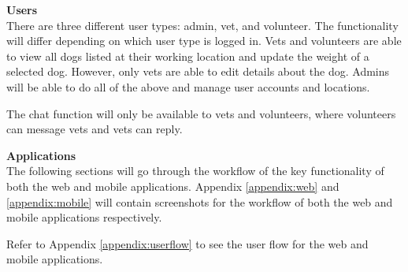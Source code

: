 \textbf{Users}\\
There are three different user types: admin, vet, and volunteer. The functionality will differ depending on which user type is logged in. Vets and volunteers are able to view all dogs listed at their working location and update the weight of a selected dog. However, only vets are able to edit details about the dog. Admins will be able to do all of the above and manage user accounts and locations.

The chat function will only be available to vets and volunteers, where volunteers can message vets and vets can reply.

\textbf{Applications}\\
The following sections will go through the workflow of the key functionality of both the web and mobile applications. Appendix \ref{appendix:web} and \ref{appendix:mobile} will contain screenshots for the workflow of both the web and mobile applications respectively.

Refer to Appendix \ref{appendix:userflow} to see the user flow for the web and mobile applications.